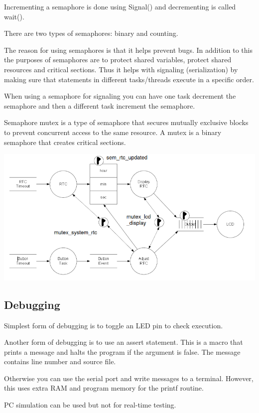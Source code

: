 Incrementing a semaphore is done using Signal() and decrementing
is called wait().

There are two types of semaphores: binary and counting.

The reason for using semaphores is that it helps prevent bugs.
In addition to this the purposes of semaphores are to protect shared
variables, protect shared resources and critical sections.
Thus it helps with signaling (serialization)
by making sure that statements in different tasks/threads execute
in a specific order.

When using a semaphore for signaling you can have one task decrement the semaphore
and then a different task increment the semaphore.

Semaphore mutex is a type of semaphore that secures mutually exclusive
blocks to prevent concurrent access to the same resource.
A mutex is a binary semaphore that creates critical sections.

\begin{center}
	\includegraphics[width=\textwidth]{images/taskSemaphore.png}
\end{center}


\subsection{Debugging}
Simplest form of debugging is to toggle an LED pin to check execution.

Another form of debugging is to use an assert statement. This
is a macro that prints a message and halts the program if the
argument is false. The message contains line number and source file.

Otherwise you can use the serial port and write messages to a terminal.
However, this uses extra RAM and program memory for the printf routine.

PC simulation can be used but not for real-time testing.


